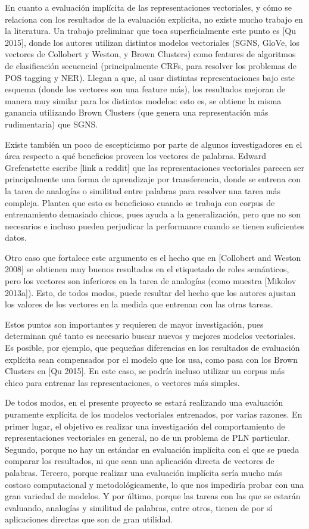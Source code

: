 En cuanto a evaluación implícita de las representaciones vectoriales, y cómo se relaciona con los
resultados de la evaluación explícita, no existe mucho trabajo en la literatura. Un trabajo
preliminar que toca superficialmente este punto es [Qu 2015], donde los autores utilizan distintos
modelos vectoriales (SGNS, GloVe, los vectores de Collobert y Weston, y Brown Clusters) como
features de algoritmos de clasificación secuencial (principalmente CRFs, para resolver los problemas
de POS tagging y NER). Llegan a que, al usar distintas representaciones bajo este esquema (donde los
vectores son una feature más), los resultados mejoran de manera muy similar para los distintos
modelos: esto es, se obtiene la misma ganancia utilizando Brown Clusters (que genera una
representación más rudimentaria) que SGNS\@.

Existe también un poco de escepticismo por parte de algunos investigadores en el área respecto a qué
beneficios proveen los vectores de palabras. Edward Grefenstette escribe [link a reddit] que las
representaciones vectoriales parecen ser principalmente una forma de aprendizaje por transferencia,
donde se entrena con la tarea de analogías o similitud entre palabras para resolver una tarea más
compleja. Plantea que esto es beneficioso cuando se trabaja con corpus de entrenamiento demasiado
chicos, pues ayuda a la generalización, pero que no son necesarios e incluso pueden perjudicar la
performance cuando se tienen suficientes datos.

Otro caso que fortalece este argumento es el hecho que en [Collobert and Weston 2008] se obtienen
muy buenos resultados en el etiquetado de roles semánticos, pero los vectores son inferiores en la
tarea de analogías (como muestra [Mikolov 2013a]). Esto, de todos modos, puede resultar del hecho
que los autores ajustan los valores de los vectores en la medida que entrenan con las otras tareas.

Estos puntos son importantes y requieren de mayor investigación, pues determinan qué tanto es
necesario buscar nuevos y mejores modelos vectoriales. Es posible, por ejemplo, que pequeñas
diferencias en los resultados de evaluación explícita sean compensados por el modelo que los usa,
como pasa con los Brown Clusters en [Qu 2015]. En este caso, se podría incluso utilizar un corpus
más chico para entrenar las representaciones, o vectores más simples.


De todos modos, en el presente proyecto se estará realizando una evaluación puramente explícita de
los modelos vectoriales entrenados, por varias razones. En primer lugar, el objetivo es realizar una
investigación del comportamiento de representaciones vectoriales en general, no de un problema de
PLN particular. Segundo, porque no hay un estándar en evaluación implícita con el que se pueda
comparar los resultados, ni que sean una aplicación directa de vectores de palabras. Tercero, porque
realizar una evaluación implícita sería mucho más costoso computacional y metodológicamente, lo que
nos impediría probar con una gran variedad de modelos. Y por último, porque las tareas con las que
se estarán evaluando, analogías y similitud de palabras, entre otros, tienen de por sí aplicaciones
directas que son de gran utilidad.


